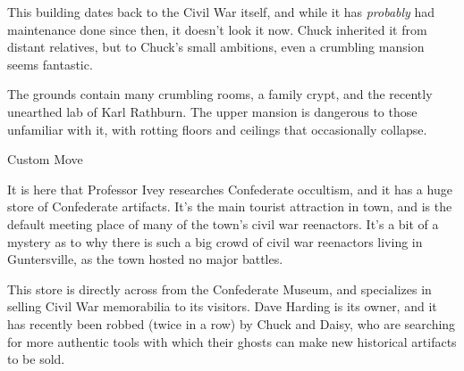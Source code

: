 \documentclass{motw}
\begin{document}

This building dates back to the Civil War itself, and while it has \emph{probably} had maintenance done since then, it doesn't look it now.  Chuck inherited it from distant relatives, but to Chuck's small ambitions, even a crumbling mansion seems fantastic.

The grounds contain many crumbling rooms, a family crypt, and the recently unearthed lab of Karl Rathburn.  The upper mansion is dangerous to those unfamiliar with it, with rotting floors and ceilings that occasionally collapse.

\begin{mStatBlock}{Custom Move}
\end{mStatBlock}



It is here that Professor Ivey researches Confederate occultism, and it has a huge store of Confederate artifacts.  It's the main tourist attraction in town, and is the default meeting place of many of the town's civil war reenactors.  It's a bit of a mystery as to why there is such a big crowd of civil war reenactors living in Guntersville, as the town hosted no major battles.


This store is directly across from the Confederate Museum, and specializes in selling Civil War memorabilia to its visitors.  Dave Harding is its owner, and it has recently been robbed (twice in a row) by Chuck and Daisy, who are searching for more authentic tools with which their ghosts can make new historical artifacts to be sold.




\makeImageCredits[cc-by-nc-sa]
\end{document}
